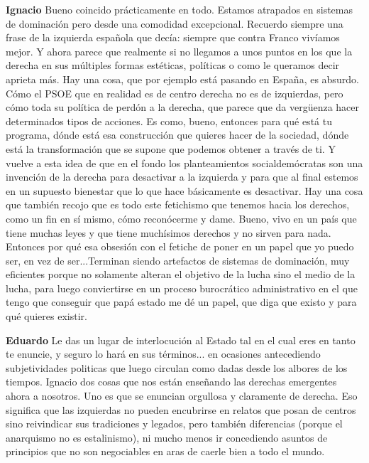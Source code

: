 \documentclass[
  spanish,
  11pt,
  a4paper,
]{scrbook}
\newenvironment{transcripcion}{
    \begin{list}{}{
        \setlength{\leftmargin}{1.5em}  %
        \setlength{\rightmargin}{0em}
        \setlength{\itemsep}{0.2em}     %
        \setlength{\parsep}{0.0em}
        \setlength{\listparindent}{0pt}
    }
}{
    \end{list}
}
\newcommand{\personaje}[1]{\textbf{#1}\quad}
\begin{document}
\begin{transcripcion}
\item \personaje{Ignacio} Bueno coincido prácticamente en todo. Estamos atrapados en sistemas de dominación pero desde una comodidad excepcional. Recuerdo siempre una frase de la izquierda española que decía: siempre que contra Franco vivíamos mejor. Y ahora parece que realmente si no llegamos a unos puntos en los que la derecha en sus múltiples formas estéticas, políticas o como le queramos decir aprieta más. Hay una cosa, que por ejemplo está pasando en España, es absurdo. Cómo el PSOE que en realidad es de centro derecha no es de izquierdas, pero cómo toda su política de perdón a la derecha, que parece que da vergüenza hacer determinados tipos de acciones. Es como, bueno, entonces para qué está tu programa, dónde está esa construcción que quieres hacer de la sociedad, dónde está la transformación que se supone que podemos obtener a través de ti. Y vuelve a esta idea de que en el fondo los planteamientos socialdemócratas son una invención de la derecha para desactivar a la izquierda y para que al final estemos en un supuesto bienestar que lo que hace básicamente es desactivar. Hay una cosa que también recojo que es todo este fetichismo que tenemos hacia los derechos, como un fin en sí mismo, cómo reconócerme y dame. Bueno, vivo en un país que tiene muchas leyes y que tiene muchísimos derechos y no sirven para nada. Entonces por qué esa obsesión con el fetiche de poner en un papel que yo puedo ser, en vez de ser...Terminan siendo artefactos de sistemas de dominación, muy eficientes porque no solamente alteran el objetivo de la lucha sino el medio de la lucha, para luego conviertirse en un proceso burocrático administrativo en el que tengo que conseguir que papá estado me dé un papel, que diga que existo y para qué quieres existir.

\item \personaje{Eduardo} Le das un lugar de interlocución al Estado tal en el cual eres en tanto te enuncie, y seguro lo hará en sus términos... en ocasiones antecediendo subjetividades politicas que luego circulan como dadas desde los albores de los tiempos. Ignacio dos cosas que nos están enseñando las derechas emergentes ahora a nosotros. Uno es que se enuncian orgullosa y claramente de derecha. Eso significa que las izquierdas no pueden encubrirse en relatos que posan de centros sino reivindicar sus tradiciones y legados, pero también diferencias (porque el anarquismo no es estalinismo), ni mucho menos ir concediendo asuntos de principios que no son negociables en aras de caerle bien a todo el mundo.


\end{transcripcion}
\end{document}
